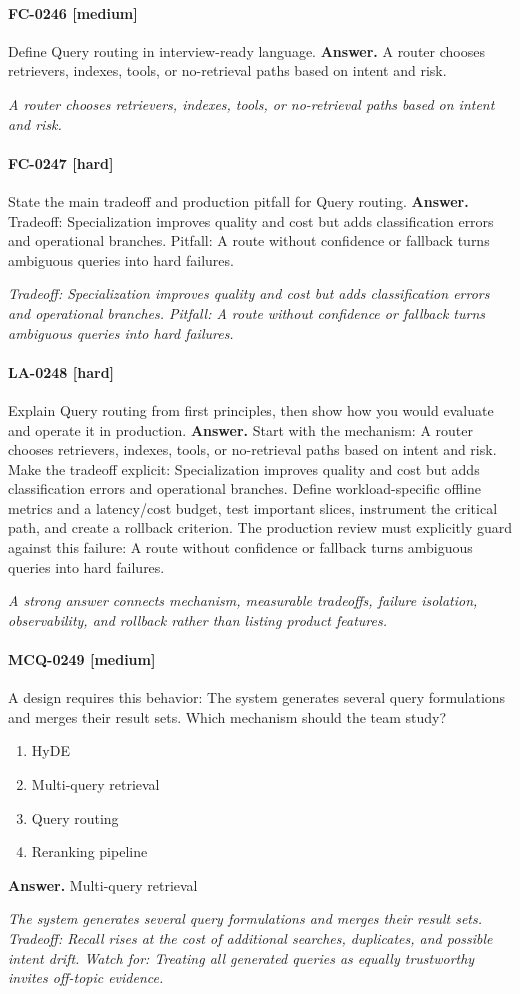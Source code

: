 \paragraph{FC-0246 [medium]} Define Query routing in interview-ready language.
\noindent\textbf{Answer.} A router chooses retrievers, indexes, tools, or no-retrieval paths based on intent and risk.
\par\textit{A router chooses retrievers, indexes, tools, or no-retrieval paths based on intent and risk.}
\paragraph{FC-0247 [hard]} State the main tradeoff and production pitfall for Query routing.
\noindent\textbf{Answer.} Tradeoff: Specialization improves quality and cost but adds classification errors and operational branches. Pitfall: A route without confidence or fallback turns ambiguous queries into hard failures.
\par\textit{Tradeoff: Specialization improves quality and cost but adds classification errors and operational branches. Pitfall: A route without confidence or fallback turns ambiguous queries into hard failures.}
\paragraph{LA-0248 [hard]} Explain Query routing from first principles, then show how you would evaluate and operate it in production.
\noindent\textbf{Answer.} Start with the mechanism: A router chooses retrievers, indexes, tools, or no-retrieval paths based on intent and risk. Make the tradeoff explicit: Specialization improves quality and cost but adds classification errors and operational branches. Define workload-specific offline metrics and a latency/cost budget, test important slices, instrument the critical path, and create a rollback criterion. The production review must explicitly guard against this failure: A route without confidence or fallback turns ambiguous queries into hard failures.
\par\textit{A strong answer connects mechanism, measurable tradeoffs, failure isolation, observability, and rollback rather than listing product features.}
\paragraph{MCQ-0249 [medium]} A design requires this behavior: The system generates several query formulations and merges their result sets. Which mechanism should the team study?
\begin{enumerate}[label=\Alph*.]
\item HyDE
\item Multi-query retrieval
\item Query routing
\item Reranking pipeline
\end{enumerate}
\noindent\textbf{Answer.} Multi-query retrieval
\par\textit{The system generates several query formulations and merges their result sets. Tradeoff: Recall rises at the cost of additional searches, duplicates, and possible intent drift. Watch for: Treating all generated queries as equally trustworthy invites off-topic evidence.}
